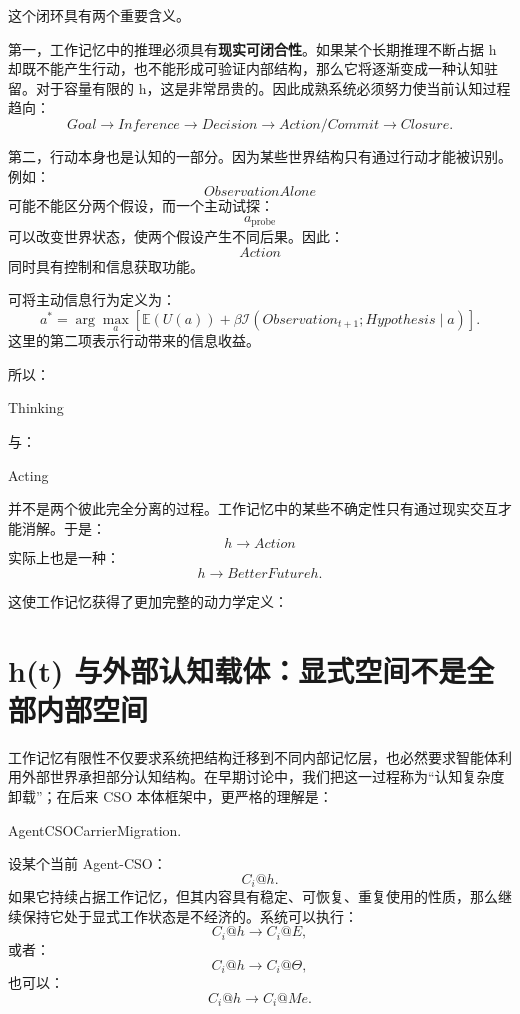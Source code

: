 这个闭环具有两个重要含义。

第一，工作记忆中的推理必须具有\textbf{现实可闭合性}。如果某个长期推理不断占据 h 却既不能产生行动，也不能形成可验证内部结构，那么它将逐渐变成一种认知驻留。对于容量有限的 h，这是非常昂贵的。因此成熟系统必须努力使当前认知过程趋向：
\[
Goal
\rightarrow
Inference
\rightarrow
Decision
\rightarrow
Action/Commit
\rightarrow
Closure.
\]

第二，行动本身也是认知的一部分。因为某些世界结构只有通过行动才能被识别。例如：
\[
ObservationAlone
\]
可能不能区分两个假设，而一个主动试探：
\[
a_{\mathrm{probe}}
\]
可以改变世界状态，使两个假设产生不同后果。因此：
\[
Action
\]
同时具有控制和信息获取功能。

可将主动信息行为定义为：
\[
a^*
=
\arg\max_a
\left[
\mathbb E(U(a))
+
\beta
\mathcal I
\left(
Observation_{t+1};
Hypothesis
\mid a
\right)
\right].
\]
这里的第二项表示行动带来的信息收益。

所以：
\begin{statementbox}
Thinking
\end{statementbox}
与：
\begin{statementbox}
Acting
\end{statementbox}
并不是两个彼此完全分离的过程。工作记忆中的某些不确定性只有通过现实交互才能消解。于是：
\[
h\rightarrow Action
\]
实际上也是一种：
\[
h\rightarrow BetterFutureh.
\]

这使工作记忆获得了更加完整的动力学定义：
\begin{statementbox}
\centering
{}
\end{statementbox}

\section{h(t) 与外部认知载体：显式空间不是全部内部空间}

工作记忆有限性不仅要求系统把结构迁移到不同内部记忆层，也必然要求智能体利用外部世界承担部分认知结构。在早期讨论中，我们把这一过程称为“认知复杂度卸载”；在后来 CSO 本体框架中，更严格的理解是：
\begin{statementbox}
AgentCSOCarrierMigration.
\end{statementbox}

设某个当前 Agent-CSO：
\[
C_i@h.
\]
如果它持续占据工作记忆，但其内容具有稳定、可恢复、重复使用的性质，那么继续保持它处于显式工作状态是不经济的。系统可以执行：
\[
C_i@h
\rightarrow
C_i@E,
\]
或者：
\[
C_i@h
\rightarrow
C_i@\Theta,
\]
也可以：
\[
C_i@h
\rightarrow
C_i@Me.
\]

